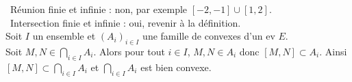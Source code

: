 \bu\ Réunion finie et infinie : non, par exemple $[-2,-1]\cup[1,2]$.\\
\bu\ Intersection finie et infinie : oui, revenir à la définition.\\
Soit $I$ un ensemble et $(A_i)_{i\in I}$ une famille de convexes d'un ev $E$.\\
Soit $M,N\in \bigcap_{i\in I} A_i$. Alors pour tout $i\in I$, $M,N\in A_i$
donc $[M,N]\subset A_i$. Ainsi $[M,N]\subset \bigcap_{i\in I}A_i$ et $\bigcap_{i\in I}A_i$
est bien convexe.
%
